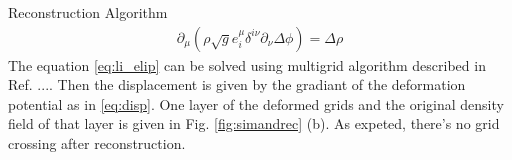 \begin{section}{Reconstruction Algorithm}
\begin{align}
 \label{eq:li_elip}
    \partial _\mu (\rho \sqrt{g} e^\mu _i \delta^{i\nu}\partial_\nu \Delta \phi)=\Delta \rho
\end{align}
The equation \ref{eq:li_elip} can be solved using multigrid algorithm described in Ref. .... Then the displacement is given by the gradiant of the deformation potential as in \ref{eq:disp}. One layer of the deformed grids and the original density field of that layer is given in Fig. \ref{fig:simandrec} (b). As expeted, there's no grid crossing after reconstruction.
%
\end{section}

